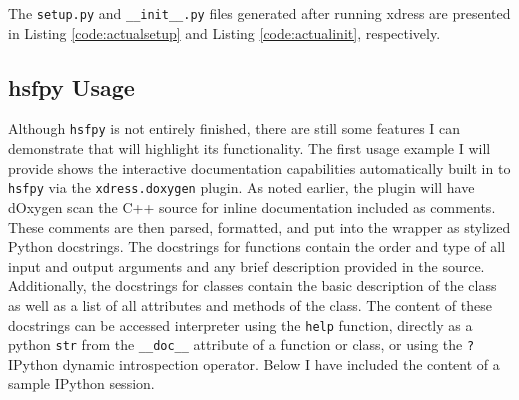   The \texttt{setup.py} and \texttt{\_\_init\_\_.py} files generated after running xdress are presented in Listing \ref{code:actualsetup} and Listing \ref{code:actualinit}, respectively.

  \vspace{.2in}
  

  \vspace{.2in}
  
  \mainstretch{}



\subsection{hsfpy Usage} \label{sub:hsfpy_usage}

  Although \texttt{hsfpy} is not entirely finished,  there are still some features I can demonstrate that will highlight its functionality.  The first usage example I will provide shows the interactive documentation capabilities automatically built in to \texttt{hsfpy} via the \texttt{xdress.doxygen} plugin.  As noted earlier, the plugin will have dOxygen scan the C++ source for inline documentation included as comments. These comments are then parsed, formatted, and put into the wrapper as stylized Python docstrings.  The docstrings for functions contain the order and type of all input and output arguments and any brief description provided in the source. Additionally, the docstrings for classes contain the basic description of the class as well as a list of all attributes and methods of the class. The content of these docstrings can be accessed interpreter using the \texttt{help} function, directly as a python \texttt{str} from the \texttt{\_\_doc\_\_} attribute of a function or class, or using the \texttt{?} IPython dynamic introspection operator.  Below I have included the content of a sample IPython session.

